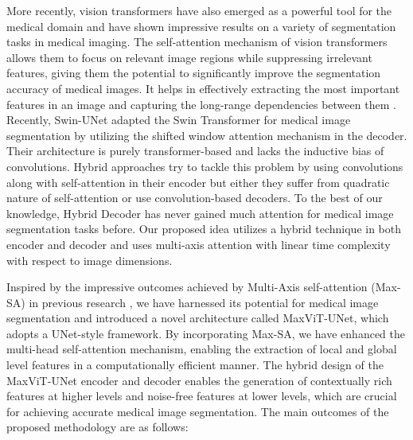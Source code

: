 \documentclass{article}
\begin{document}
More recently, vision transformers \cite{dosovitskiy2021an, chen2021transunet, valanarasu2021medical, cao2022swin, wang2022uctransnet} have also emerged as a powerful tool for the medical domain and have shown impressive results on a variety of segmentation tasks in medical imaging. The self-attention mechanism of vision transformers allows them to focus on relevant image regions while suppressing irrelevant features, giving them the potential to significantly improve the segmentation accuracy of medical images. It helps in effectively extracting the most important features in an image and capturing the long-range dependencies between them \cite{dosovitskiy2021an}. Recently, Swin-UNet \cite{cao2022swin} adapted the Swin Transformer for medical image segmentation by utilizing the shifted window attention mechanism in the decoder. Their architecture is purely transformer-based and lacks the inductive bias of convolutions. Hybrid approaches \cite{zhang2021transfuse, li2023attransunet, guo2022cmt, li2022next, yao2022transclaw, ji2021multi, zhou2021nnformer} try to tackle this problem by using convolutions along with self-attention in their encoder but either they suffer from quadratic nature of self-attention or use convolution-based decoders. To the best of our knowledge, Hybrid Decoder has never gained much attention for medical image segmentation tasks before. Our proposed idea utilizes a hybrid technique in both encoder and decoder and uses multi-axis attention with linear time complexity with respect to image dimensions.

Inspired by the impressive outcomes achieved by Multi-Axis self-attention (Max-SA) in previous research \cite{tu2022maxvit}, we have harnessed its potential for medical image segmentation and introduced a novel architecture called MaxViT-UNet, which adopts a UNet-style framework. By incorporating Max-SA, we have enhanced the multi-head self-attention mechanism, enabling the extraction of local and global level features in a computationally efficient manner. The hybrid design of the MaxViT-UNet encoder and decoder enables the generation of contextually rich features at higher levels and noise-free features at lower levels, which are crucial for achieving accurate medical image segmentation. The main outcomes of the proposed methodology are as follows:
\end{document}
